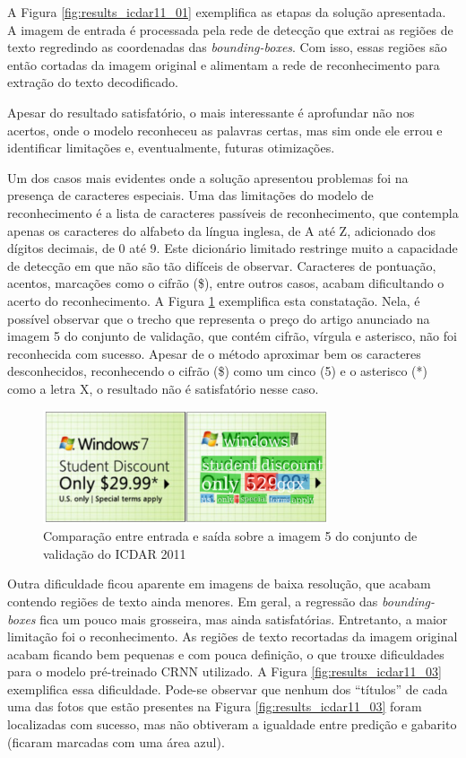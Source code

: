 A Figura \ref{fig:results_icdar11_01} exemplifica as etapas da solução apresentada. A imagem de entrada é processada pela rede de 
detecção que extrai as regiões de texto regredindo as coordenadas das \textit{bounding-boxes}. Com isso, essas regiões são então 
cortadas da imagem original e alimentam a rede de reconhecimento para extração do texto decodificado.

Apesar do resultado satisfatório, o mais interessante é aprofundar não nos acertos, onde o modelo reconheceu as palavras certas, 
mas sim onde ele errou e identificar limitações e, eventualmente, futuras otimizações.

Um dos casos mais evidentes onde a solução apresentou problemas foi na presença de caracteres especiais. Uma das limitações do 
modelo de reconhecimento é a lista de caracteres passíveis de reconhecimento, que contempla apenas os caracteres do alfabeto da 
língua inglesa, de A até Z, adicionado dos dígitos decimais, de 0 até 9. Este dicionário limitado restringe muito a capacidade 
de detecção em que não são tão difíceis de observar. Caracteres de pontuação, acentos, marcações como o cifrão (\$), entre 
outros casos, acabam dificultando o acerto do reconhecimento. A Figura \ref{fig:results_icdar11_02} exemplifica esta constatação. 
Nela, é possível observar que o trecho que representa o preço do artigo anunciado na imagem 5 do conjunto de validação, que 
contém cifrão, vírgula e asterisco, não foi reconhecida com sucesso. Apesar de o método aproximar bem os caracteres desconhecidos, 
reconhecendo o cifrão (\$) como um cinco (5) e o asterisco (*) como a letra X, o resultado não é satisfatório nesse caso.

\begin{figure}
    \centering
    \includegraphics[width=0.75\textwidth]{figs/resultados-icdar11-02.png}
    \caption{Comparação entre entrada e saída sobre a imagem 5 do conjunto de validação do ICDAR 2011}
    \label{fig:results_icdar11_02}
\end{figure}

Outra dificuldade ficou aparente em imagens de baixa resolução, que acabam contendo regiões de texto ainda menores. Em geral, 
a regressão das \textit{bounding-boxes} fica um pouco mais grosseira, mas ainda satisfatórias. Entretanto, a maior limitação 
foi o reconhecimento. As regiões de texto recortadas da imagem original acabam ficando bem pequenas e com pouca definição, o 
que trouxe dificuldades para o modelo pré-treinado CRNN utilizado. A Figura \ref{fig:results_icdar11_03} exemplifica essa 
dificuldade. Pode-se observar que nenhum dos “títulos” de cada uma das fotos que estão presentes na Figura \ref{fig:results_icdar11_03} 
foram localizadas com sucesso, mas não obtiveram a igualdade entre predição e gabarito (ficaram marcadas com uma área azul).

